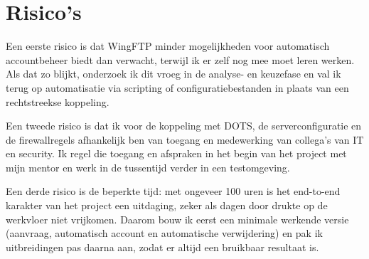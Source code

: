 
\section{Risico's}%
\label{vst:risicos}

%

Een eerste risico is dat WingFTP minder mogelijkheden voor automatisch accountbeheer biedt dan verwacht, terwijl ik er zelf nog mee moet leren werken. Als dat zo blijkt, onderzoek ik dit vroeg in de analyse- en keuzefase en val ik terug op automatisatie via scripting of configuratiebestanden in plaats van een rechtstreekse koppeling.

Een tweede risico is dat ik voor de koppeling met DOTS, de serverconfiguratie en de firewallregels afhankelijk ben van toegang en medewerking van collega's van IT en security. Ik regel die toegang en afspraken in het begin van het project met mijn mentor en werk in de tussentijd verder in een testomgeving.

Een derde risico is de beperkte tijd: met ongeveer 100 uren is het end-to-end karakter van het project een uitdaging, zeker als dagen door drukte op de werkvloer niet vrijkomen. Daarom bouw ik eerst een minimale werkende versie (aanvraag, automatisch account en automatische verwijdering) en pak ik uitbreidingen pas daarna aan, zodat er altijd een bruikbaar resultaat is.
